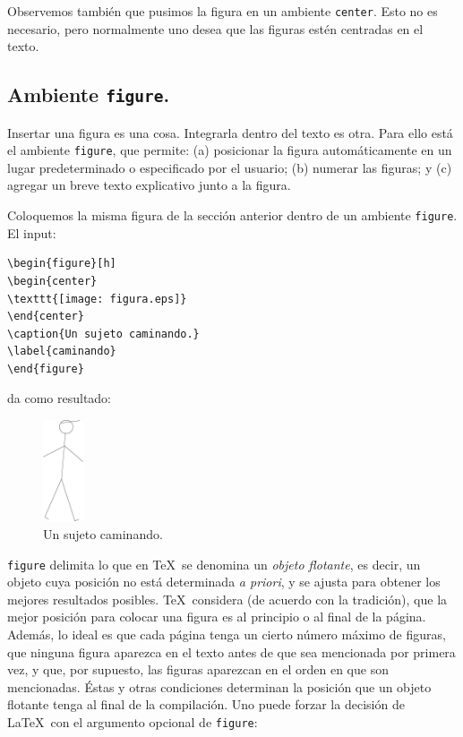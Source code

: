 {Observemos tambi\'en que pusimos la figura en un ambiente
\verb+center+. Esto no es necesario, pero normalmente uno desea que
las figuras est\'en centradas en el texto. 

\subsection{Ambiente {\tt figure}.}

Insertar una figura es una cosa. Integrarla dentro del texto es
otra. Para ello est\'a el ambiente \verb+figure+, que permite:
(a) posicionar la figura autom\'aticamente en un lugar predeterminado o
especificado por el usuario; (b) numerar las figuras; y (c) agregar un
breve texto explicativo junto a la figura.

Coloquemos la misma figura de la secci\'on anterior dentro de un
ambiente \verb+figure+. El input:
\begin{verbatim}
\begin{figure}[h]
\begin{center}
\texttt{[image: figura.eps]} 
\end{center}
\caption{Un sujeto caminando.}
\label{caminando}
\end{figure}
\end{verbatim}
da como resultado:
\begin{figure}[h]
\begin{center}
\includegraphics[height=3cm]{figura} %
\end{center}
\caption{Un sujeto caminando.}
\label{caminando}
\end{figure}

\verb+figure+ delimita lo que en \TeX\ se denomina un {\it objeto
  flotante}, es decir, un objeto cuya posici\'on no est\'a determinada
{\it a priori}, y se ajusta para obtener los mejores resultados
posibles. \TeX\ considera (de acuerdo con la tradici\'on), que la
mejor posici\'on para colocar una figura es al principio o al final de
la p\'agina. Adem\'as, lo ideal es que cada p\'agina tenga un cierto
n\'umero m\'aximo de figuras, que  ninguna figura
aparezca en el texto antes de que sea mencionada por primera
vez, y que, por supuesto, las figuras aparezcan en el orden en que son
mencionadas. \'Estas y otras condiciones determinan la posici\'on que un
objeto flotante tenga al final de la compilaci\'on. Uno puede forzar
la decisi\'on de \LaTeX\ con el argumento opcional de \verb+figure+:

}
